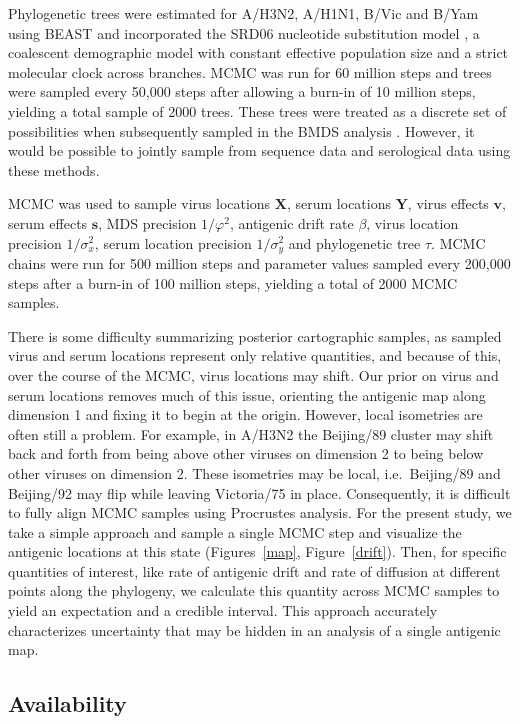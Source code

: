 \documentclass[11pt,oneside,letterpaper]{article}
\newcommand{\viruses}{\mathbf{X}}					%
\newcommand{\sera}{\mathbf{Y}}						%
\newcommand{\ves}{\mathbf{v}}						%
\newcommand{\ses}{\mathbf{s}}						%
\newcommand{\mdssd}{\varphi}						%
\newcommand{\virussd}{\sigma_x}						%
\newcommand{\serumsd}{\sigma_y}						%
\newcommand{\tree}{\tau}							%
\begin{document}
Phylogenetic trees were estimated for A/H3N2, A/H1N1, B/Vic and B/Yam using BEAST \cite{BEAST17} and incorporated the SRD06 nucleotide substitution model \cite{Shapiro06}, a coalescent demographic model with constant effective population size and a strict molecular clock across branches.
MCMC was run for 60 million steps and trees were sampled every 50,000 steps after allowing a burn-in of 10 million steps, yielding a total sample of 2000 trees.
These trees were treated as a discrete set of possibilities when subsequently sampled in the BMDS analysis \cite{Pagel04}.
However, it would be possible to jointly sample from sequence data and serological data using these methods.

MCMC was used to sample virus locations $\viruses$, serum locations $\sera$, virus effects $\ves$, serum effects $\ses$, MDS precision $1/\mdssd^2$, antigenic drift rate $\beta$, virus location precision $1/\virussd^2$, serum location precision $1/\serumsd^2$ and phylogenetic tree $\tree$.
MCMC chains were run for 500 million steps and parameter values sampled every 200,000 steps after a burn-in of 100 million steps, yielding a total of 2000 MCMC samples.

There is some difficulty summarizing posterior cartographic samples, as sampled virus and serum locations represent only relative quantities, and because of this, over the course of the MCMC, virus locations may shift.
Our prior on virus and serum locations removes much of this issue, orienting the antigenic map along dimension 1 and fixing it to begin at the origin.
However, local isometries are often still a problem.
For example, in A/H3N2 the Beijing/89 cluster may shift back and forth from being above other viruses on dimension 2 to being below other viruses on dimension 2.
These isometries may be local, i.e.\ Beijing/89 and Beijing/92 may flip while leaving Victoria/75 in place.
Consequently, it is difficult to fully align MCMC samples using Procrustes analysis.
For the present study, we take a simple approach and sample a single MCMC step and visualize the antigenic locations at this state (Figures~\ref{map}, Figure~\ref{drift}).
Then, for specific quantities of interest, like rate of antigenic drift and rate of diffusion at different points along the phylogeny, we calculate this quantity across MCMC samples to yield an expectation and a credible interval.
This approach accurately characterizes uncertainty that may be hidden in an analysis of a single antigenic map.

\subsection*{Availability}
\end{document}
